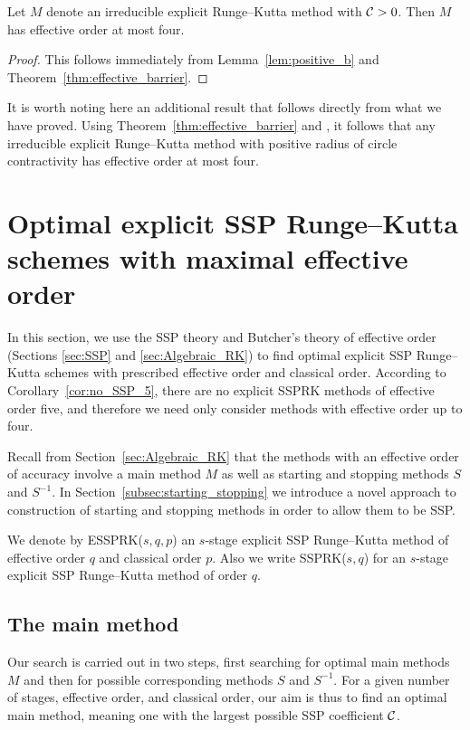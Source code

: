 \documentclass{siamltex}  %
\begin{document}
\begin{corollary}\label{cor:no_SSP_5}
    Let $M$ denote an irreducible explicit Runge--Kutta method with $\mathcal{C}>0$.
    Then $M$ has effective order at most four.
\end{corollary}
\begin{proof}
	This follows immediately from Lemma~\ref{lem:positive_b} and 
	Theorem~\ref{thm:effective_barrier}.
\end{proof}

\begin{remark}
    It is worth noting here an additional result that 
    follows directly from what we have proved.
    Using Theorem~\ref{thm:effective_barrier} and \cite[Theorem~4.1]{dahlquist2006}, 
    it follows that any irreducible explicit Runge--Kutta method with positive radius of
    circle contractivity has effective order at most four.
\end{remark}


\section{Optimal explicit SSP Runge--Kutta schemes with maximal effective order}\label{sec:optimal_ESSPRK}
In this section, we use the SSP theory and Butcher's theory of effective
order (Sections \ref{sec:SSP} and \ref{sec:Algebraic_RK}) to find
optimal explicit SSP Runge--Kutta schemes with prescribed effective
order and classical order.
According to Corollary~\ref{cor:no_SSP_5}, there are no explicit SSPRK methods of
effective order five, and therefore we need only consider methods with
effective order up to four.

Recall from Section~\ref{sec:Algebraic_RK} that the methods with
an effective order of accuracy involve a main method $M$ as well as starting and
stopping methods $S$ and $S^{-1}$.
In Section~\ref{subsec:starting_stopping} we introduce a novel approach
to construction of starting and stopping methods in order to allow
them to be SSP.

We denote by ESSPRK($s,q,p$) an $s$-stage explicit SSP Runge--Kutta
method of effective order $q$ and classical order $p$.
Also we write SSPRK($s,q$) for an $s$-stage explicit SSP Runge--Kutta
method of order $q$.

\subsection{The main method}\label{subsec:main_method}
Our search is carried out in two
steps, first searching for optimal main methods $M$ and then for
possible corresponding methods $S$ and $S^{-1}$.
For a given number of stages, effective order, and classical order,
our aim is thus to find an optimal main method, meaning one with the 
largest possible SSP coefficient $\mathcal{C}$.
\end{document}
